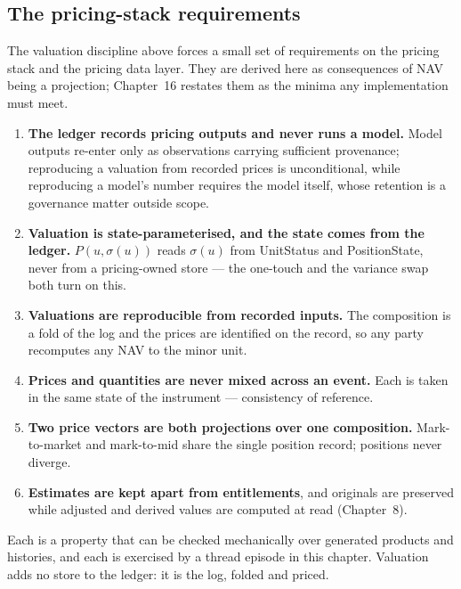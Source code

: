 \subsection{The pricing-stack requirements}

The valuation discipline above forces a small set of requirements on the
pricing stack and the pricing data layer. They are derived here as consequences
of NAV being a projection; Chapter~16 restates them as the minima any
implementation must meet.

\begin{enumerate}[label=P\arabic*.,leftmargin=*]
\item \textbf{The ledger records pricing outputs and never runs a model.}
  Model outputs re-enter only as observations carrying sufficient provenance;
  reproducing a valuation from recorded prices is unconditional, while
  reproducing a model's number requires the model itself, whose retention is a
  governance matter outside scope.
\item \textbf{Valuation is state-parameterised, and the state comes from the
  ledger.} $P(u,\sigma(u))$ reads $\sigma(u)$ from UnitStatus and
  PositionState, never from a pricing-owned store --- the one-touch and the
  variance swap both turn on this.
\item \textbf{Valuations are reproducible from recorded inputs.} The
  composition is a fold of the log and the prices are identified on the record,
  so any party recomputes any NAV to the minor unit.
\item \textbf{Prices and quantities are never mixed across an event.} Each
  is taken in the same state of the instrument --- consistency of reference.
\item \textbf{Two price vectors are both projections over one composition.}
  Mark-to-market and mark-to-mid share the single position record; positions
  never diverge.
\item \textbf{Estimates are kept apart from entitlements}, and originals are
  preserved while adjusted and derived values are computed at read
  (Chapter~8).
\end{enumerate}

Each is a property that can be checked mechanically over generated products and
histories, and each is exercised by a thread episode in this chapter. Valuation
adds no store to the ledger: it is the log, folded and priced.
